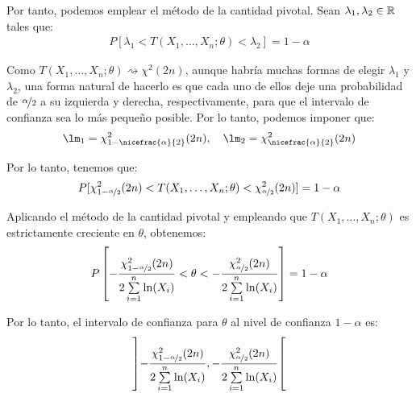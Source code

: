 \begin{ejemplo}
    Por tanto, podemos emplear el método de la cantidad pivotal. Sean $\lambda_1,\lambda_2\in \mathbb{R}$ tales que:
    \begin{align*}
        P[\lambda_1 < T(X_1, \ldots, X_n; \theta) < \lambda_2] = 1 - \alpha
    \end{align*}

    Como $T(X_1, \ldots, X_n; \theta) \rightsquigarrow \chi^2(2n)$, aunque habría muchas formas de elegir $\lambda_1$ y $\lambda_2$, una forma natural de hacerlo es que cada uno de ellos deje una probabilidad de $\nicefrac{\alpha}{2}$ a su izquierda y derecha, respectivamente, para que el intervalo de confianza sea lo más pequeño posible. Por lo tanto, podemos imponer que:
    \begin{align*}
        \lm_1 = \chi^2_{1-\nicefrac{\alpha}{2}}(2n), \quad \lm_2 = \chi^2_{\nicefrac{\alpha}{2}}(2n)
    \end{align*}

    Por lo tanto, tenemos que:
    \begin{align*}
        P[\chi^2_{1-\nicefrac{\alpha}{2}}(2n) < T(X_1, \ldots, X_n; \theta) < \chi^2_{\nicefrac{\alpha}{2}}(2n)] = 1 - \alpha
    \end{align*}

    Aplicando el método de la cantidad pivotal y empleando que $T(X_1, \ldots, X_n; \theta)$ es estrictamente creciente en $\theta$, obtenemos:
    \begin{align*}
        P\left[-\frac{\chi^2_{1-\nicefrac{\alpha}{2}}(2n)}{2\sum\limits_{i=1}^{n} \ln(X_i)} < \theta < -\frac{\chi^2_{\nicefrac{\alpha}{2}}(2n)}{2\sum\limits_{i=1}^{n} \ln(X_i)}\right] = 1 - \alpha
    \end{align*}

    Por lo tanto, el intervalo de confianza para $\theta$ al nivel de confianza $1 - \alpha$ es:
    \begin{align*}
        \left]-\frac{\chi^2_{1-\nicefrac{\alpha}{2}}(2n)}{2\sum\limits_{i=1}^{n} \ln(X_i)}, -\frac{\chi^2_{\nicefrac{\alpha}{2}}(2n)}{2\sum\limits_{i=1}^{n} \ln(X_i)}\right[
    \end{align*}    
\end{ejemplo}

